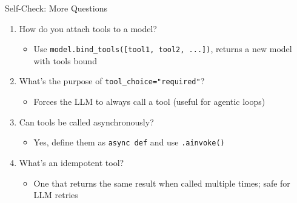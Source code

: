 \documentclass[aspectratio=169,11pt]{beamer}
\begin{document}
\begin{frame}[fragile]{Self-Check: More Questions}
\begin{enumerate}\setlength{\itemsep}{1pt}
  \setcounter{enumi}{4}
  \item How do you attach tools to a model?
    \begin{itemize}\setlength{\itemsep}{1pt}\small
      \item Use \texttt{model.bind\_tools([tool1, tool2, ...])}, returns a new model with tools bound
    \end{itemize}

  \item What's the purpose of \texttt{tool\_choice="required"}?
    \begin{itemize}\setlength{\itemsep}{1pt}\small
      \item Forces the LLM to always call a tool (useful for agentic loops)
    \end{itemize}

  \item Can tools be called asynchronously?
    \begin{itemize}\setlength{\itemsep}{1pt}\small
      \item Yes, define them as \texttt{async def} and use \texttt{.ainvoke()}
    \end{itemize}

  \item What's an idempotent tool?
    \begin{itemize}\setlength{\itemsep}{1pt}\small
      \item One that returns the same result when called multiple times; safe for LLM retries
    \end{itemize}
\end{enumerate}
\end{frame}
\end{document}
